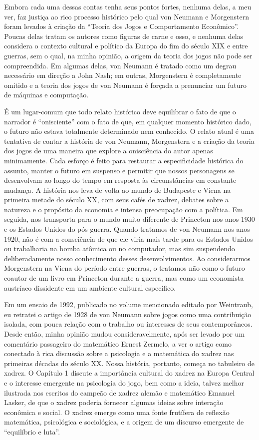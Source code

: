 \documentclass[12pt]{article}
\begin{document}
Embora cada uma dessas contas tenha seus pontos fortes, nenhuma delas, a meu ver, faz justiça ao rico processo histórico pelo qual von Neumann e Morgenstern foram levados à criação da “Teoria dos Jogos e Comportamento Econômico”. Poucas delas tratam os autores como figuras de carne e osso, e nenhuma delas considera o contexto cultural e político da Europa do fim do século XIX e entre guerras, sem o qual, na minha opinião, a origem da teoria dos jogos não pode ser compreendida. Em algumas delas, von Neumann é tratado como um degrau necessário em direção a John Nash; em outras, Morgenstern é completamente omitido e a teoria dos jogos de von Neumann é forçada a prenunciar um futuro de máquinas e computação.

É um lugar-comum que todo relato histórico deve equilibrar o fato de que o narrador é “onisciente” com o fato de que, em qualquer momento histórico dado, o futuro não estava totalmente determinado nem conhecido. O relato atual é uma tentativa de contar a história de von Neumann, Morgenstern e a criação da teoria dos jogos de uma maneira que explore a onisciência do autor apenas minimamente. Cada esforço é feito para restaurar a especificidade histórica do assunto, manter o futuro em suspenso e permitir que nossos personagens se desenvolvam ao longo do tempo em resposta às circunstâncias em constante mudança. A história nos leva de volta ao mundo de Budapeste e Viena na primeira metade do século XX, com seus cafés de xadrez, debates sobre a natureza e o propósito da economia e intensa preocupação com a política. Em seguida, nos transporta para o mundo muito diferente de Princeton nos anos 1930 e os Estados Unidos do pós-guerra. Quando tratamos de von Neumann nos anos 1920, não é com a consciência de que ele viria mais tarde para os Estados Unidos ou trabalharia na bomba atômica ou no computador, mas sim suspendendo deliberadamente nosso conhecimento desses desenvolvimentos. Ao considerarmos Morgenstern na Viena do período entre guerras, o tratamos não como o futuro coautor de um livro em Princeton durante a guerra, mas como um economista austríaco dissidente em um ambiente cultural específico.

Em um ensaio de 1992, publicado no volume mencionado editado por Weintraub, eu retratei o artigo de 1928 de von Neumann sobre jogos como uma contribuição isolada, com pouca relação com o trabalho ou interesses de seus contemporâneos. Desde então, minha opinião mudou consideravelmente, após ser levado por um comentário passageiro do matemático Ernest Zermelo, a ver o artigo como conectado à rica discussão sobre a psicologia e a matemática do xadrez nas primeiras décadas do século XX. Nossa história, portanto, começa no tabuleiro de xadrez. O Capítulo 1 discute a importância cultural do xadrez na Europa Central e o interesse emergente na psicologia do jogo, bem como a ideia, talvez melhor ilustrada nos escritos do campeão de xadrez alemão e matemático Emanuel Lasker, de que o xadrez poderia fornecer algumas ideias sobre interação econômica e social. O xadrez emerge como uma fonte frutífera de reflexão matemática, psicológica e sociológica, e a origem de um discurso emergente de “equilíbrio e luta”.
\end{document}

